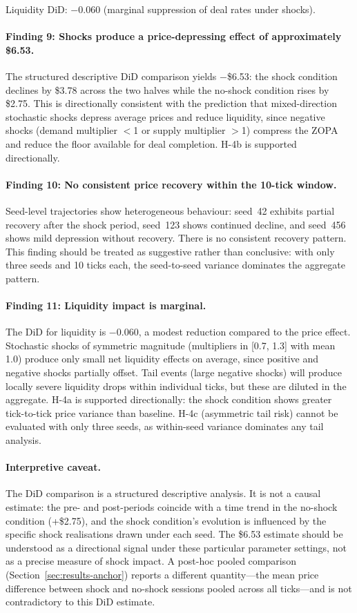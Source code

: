 Liquidity DiD: $-0.060$ (marginal suppression of deal rates under shocks).

\paragraph{Finding 9: Shocks produce a price-depressing effect of approximately \$6.53.}
The structured descriptive DiD comparison yields $-$\$6.53: the shock condition declines by \$3.78 across the two halves while the no-shock condition rises by \$2.75.  This is directionally consistent with the prediction that mixed-direction stochastic shocks depress average prices and reduce liquidity, since negative shocks (demand multiplier $<$1 or supply multiplier $>$1) compress the ZOPA and reduce the floor available for deal completion.  H-4b is supported directionally.

\paragraph{Finding 10: No consistent price recovery within the 10-tick window.}
Seed-level trajectories show heterogeneous behaviour: seed~42 exhibits partial recovery after the shock period, seed~123 shows continued decline, and seed~456 shows mild depression without recovery.  There is no consistent recovery pattern.  This finding should be treated as suggestive rather than conclusive: with only three seeds and 10 ticks each, the seed-to-seed variance dominates the aggregate pattern.

\paragraph{Finding 11: Liquidity impact is marginal.}
The DiD for liquidity is $-0.060$, a modest reduction compared to the price effect.  Stochastic shocks of symmetric magnitude (multipliers in [0.7, 1.3] with mean 1.0) produce only small net liquidity effects on average, since positive and negative shocks partially offset.  Tail events (large negative shocks) will produce locally severe liquidity drops within individual ticks, but these are diluted in the aggregate.  H-4a is supported directionally: the shock condition shows greater tick-to-tick price variance than baseline.  H-4c (asymmetric tail risk) cannot be evaluated with only three seeds, as within-seed variance dominates any tail analysis.

\paragraph{Interpretive caveat.}
The DiD comparison is a structured descriptive analysis.  It is not a causal estimate: the pre- and post-periods coincide with a time trend in the no-shock condition (+\$2.75), and the shock condition's evolution is influenced by the specific shock realisations drawn under each seed.  The \$6.53 estimate should be understood as a directional signal under these particular parameter settings, not as a precise measure of shock impact.  A post-hoc pooled comparison (Section~\ref{sec:results-anchor}) reports a different quantity---the mean price difference between shock and no-shock sessions pooled across all ticks---and is not contradictory to this DiD estimate.

